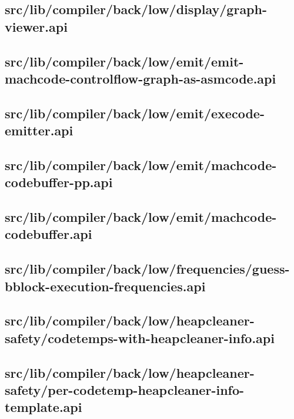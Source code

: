 \subsection{src/lib/compiler/back/low/display/graph-viewer.api}


\subsection{src/lib/compiler/back/low/emit/emit-machcode-controlflow-graph-as-asmcode.api}


\subsection{src/lib/compiler/back/low/emit/execode-emitter.api}


\subsection{src/lib/compiler/back/low/emit/machcode-codebuffer-pp.api}


\subsection{src/lib/compiler/back/low/emit/machcode-codebuffer.api}


\subsection{src/lib/compiler/back/low/frequencies/guess-bblock-execution-frequencies.api}


\subsection{src/lib/compiler/back/low/heapcleaner-safety/codetemps-with-heapcleaner-info.api}


\subsection{src/lib/compiler/back/low/heapcleaner-safety/per-codetemp-heapcleaner-info-template.api}


